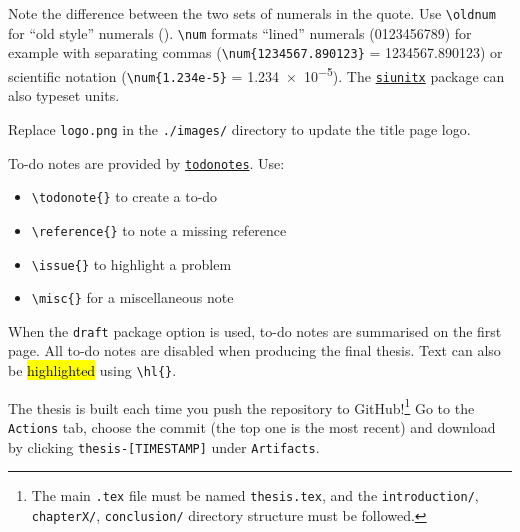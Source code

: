 
Note the difference between the two sets of numerals in the quote. Use \verb|\oldnum| for
``old style'' numerals (). \verb|\num| formats ``lined'' numerals (0123456789)
for example with separating commas (\verb|\num{1234567.890123}| = \num{1234567.890123}) or 
scientific notation (\verb|\num{1.234e-5}| = \num{1.234e-5}). The \href{https://ctan.org/pkg/siunitx}{\texttt{siunitx}}
package can also typeset units.


Replace \texttt{logo.png} in the \texttt{./images/} directory to update the title page logo.

\label{sec:todonotes}

To-do notes are provided by \href{https://ctan.org/pkg/todonotes}{\texttt{todonotes}}. Use:
\begin{itemize}
  \item \verb|\todonote{}| to create a to-do
  \item \verb|\reference{}| to note a missing reference
  \item \verb|\issue{}| to highlight a problem
  \item \verb|\misc{}| for a miscellaneous note
\end{itemize}

When the \texttt{draft} package option is used, to-do notes are summarised on the first
page. All to-do notes are disabled when producing the final thesis. Text can also be \hl{highlighted} using \verb|\hl{}|. 



The thesis is built each time you push the repository to GitHub!\footnote{The main \texttt{.tex}
file must be named \texttt{thesis.tex}, and the \texttt{introduction/}, \texttt{chapterX/},
\texttt{conclusion/} directory structure must be followed.} Go to the \texttt{Actions}
tab, choose the commit (the top one is the most recent) and download by clicking \texttt{thesis-[TIMESTAMP]}
under \texttt{Artifacts}.


